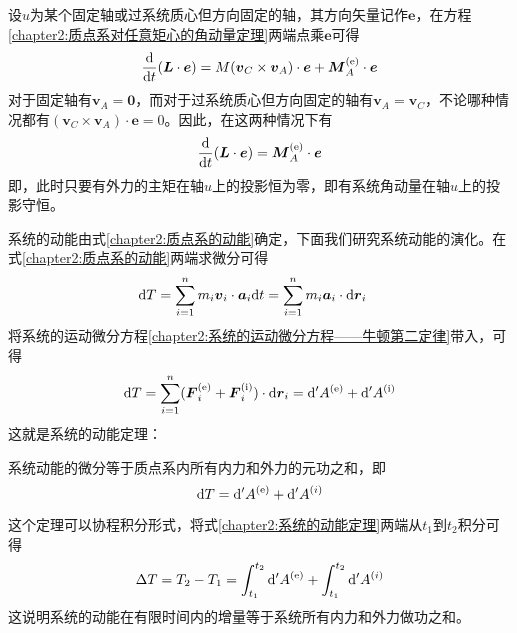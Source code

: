 设$u$为某个固定轴或过系统质心但方向固定的轴，其方向矢量记作$\boldsymbol{e}$，在方程\eqref{chapter2:质点系对任意矩心的角动量定理}两端点乘$\boldsymbol{e}$可得
\begin{equation}
	\frac{\mathrm{d}}{\mathrm{d} t}(\boldsymbol{L}\cdot \boldsymbol{e}) = M (\boldsymbol{v}_C\times \boldsymbol{v}_A) \cdot \boldsymbol{e} + \boldsymbol{M}_A^{(\mathrm{e})}\cdot \boldsymbol{e}
\end{equation}
对于固定轴有$\boldsymbol{v}_A=\boldsymbol{0}$，而对于过系统质心但方向固定的轴有$\boldsymbol{v}_A=\boldsymbol{v}_C$，不论哪种情况都有$(\boldsymbol{v}_C\times \boldsymbol{v}_A) \cdot \boldsymbol{e} = 0$。因此，在这两种情况下有
\begin{equation}
	\frac{\mathrm{d}}{\mathrm{d} t}(\boldsymbol{L}\cdot \boldsymbol{e}) = \boldsymbol{M}_A^{(\mathrm{e})}\cdot \boldsymbol{e}
\end{equation}
即，此时只要有外力的主矩在轴$u$上的投影恒为零，即有系统角动量在轴$u$上的投影守恒。

系统的动能由式\eqref{chapter2:质点系的动能}确定，下面我们研究系统动能的演化。在式\eqref{chapter2:质点系的动能}两端求微分可得
\begin{align}
	\mathrm{d} T & = \sum_{i=1}^n m_i\boldsymbol{v}_i \cdot \boldsymbol{a}_i\mathrm{d} t = \sum_{i=1}^n m_i\boldsymbol{a}_i \cdot \mathrm{d} \boldsymbol{r}_i
\end{align}
将系统的运动微分方程\eqref{chapter2:系统的运动微分方程——牛顿第二定律}带入，可得
\begin{equation}
	\mathrm{d} T = \sum_{i=1}^n (\boldsymbol{F}_i^{(\mathrm{e})} + \boldsymbol{F}_i^{(\mathrm{i})}) \cdot \mathrm{d} \boldsymbol{r}_i = \mathrm{d}' A^{(\mathrm{e})} + \mathrm{d}' A^{(\mathrm{i})}
\end{equation}
这就是系统的动能定理：

\begin{theorem}[动能定理]
	系统动能的微分等于质点系内所有内力和外力的元功之和，即
	\begin{equation}
		\mathrm{d} T = \mathrm{d}' A^{(\mathrm{e})} + \mathrm{d}' A^{(i)}
		\label{chapter2:系统的动能定理}
	\end{equation}
\end{theorem}

这个定理可以协程积分形式，将式\eqref{chapter2:系统的动能定理}两端从$t_1$到$t_2$积分可得
\begin{equation}
	\Delta T = T_2 - T_1 = \int_{t_1}^{t_2}\mathrm{d}' A^{(\mathrm{e})} + \int_{t_1}^{t_2}\mathrm{d}' A^{(i)}
\end{equation}
这说明系统的动能在有限时间内的增量等于系统所有内力和外力做功之和。

